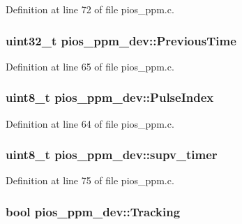 \-Definition at line 72 of file pios\-\_\-ppm.\-c.

\hypertarget{structpios__ppm__dev_acdc4c4f35b3ab795bcf29ecc9a3f4b45}{
\subsubsection[{\-Previous\-Time}]{\setlength{\rightskip}{0pt plus 5cm}uint32\-\_\-t {\bf pios\-\_\-ppm\-\_\-dev\-::\-Previous\-Time}}}\label{structpios__ppm__dev_acdc4c4f35b3ab795bcf29ecc9a3f4b45}


\-Definition at line 65 of file pios\-\_\-ppm.\-c.

\hypertarget{structpios__ppm__dev_a86d68429cfa42b6688d6bc4c307de08e}{
\subsubsection[{\-Pulse\-Index}]{\setlength{\rightskip}{0pt plus 5cm}uint8\-\_\-t {\bf pios\-\_\-ppm\-\_\-dev\-::\-Pulse\-Index}}}\label{structpios__ppm__dev_a86d68429cfa42b6688d6bc4c307de08e}


\-Definition at line 64 of file pios\-\_\-ppm.\-c.

\hypertarget{structpios__ppm__dev_a8fdc1201ea1c7fe32a543a16a7b82be6}{
\subsubsection[{supv\-\_\-timer}]{\setlength{\rightskip}{0pt plus 5cm}uint8\-\_\-t {\bf pios\-\_\-ppm\-\_\-dev\-::supv\-\_\-timer}}}\label{structpios__ppm__dev_a8fdc1201ea1c7fe32a543a16a7b82be6}


\-Definition at line 75 of file pios\-\_\-ppm.\-c.

\hypertarget{structpios__ppm__dev_a70b81899f6e07040bde7d33575b7c7ac}{
\subsubsection[{\-Tracking}]{\setlength{\rightskip}{0pt plus 5cm}bool {\bf pios\-\_\-ppm\-\_\-dev\-::\-Tracking}}}\label{structpios__ppm__dev_a70b81899f6e07040bde7d33575b7c7ac}


